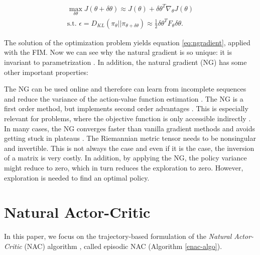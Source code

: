 \begin{align}
	\max_{\delta\theta} J(\theta + \delta\theta) \approx J(\theta) + \delta\theta^T\nabla_\theta J(\theta)\label{ng1}\\
	\text{s.t. } \epsilon = D_{KL}(\pi_{\theta} || \pi_{\theta + \delta\theta}) \approx \tfrac{1}{2} \delta\theta^T F_\theta \delta\theta\label{ng2}.
\end{align}

\noindent The solution of the optimization problem yields equation \ref{eq:ngradient}, applied with the FIM. Now we can see why the natural gradient is so unique: it is invariant to parametrization \citep{pascanu2013revisiting, peters2008natural}. In addition, the natural gradient (NG) has some other important properties:

\begin{itemize}
	\x {} The NG can be used online and therefore can learn from incomplete sequences and reduce the variance of the action-value function estimation \cite{pascanu2013revisiting, peters2008natural}.
	\x {} The NG is a first order method, but implements second order advantages \cite{pascanu2013revisiting}. This is especially relevant for problems, where the objective function is only accessible indirectly \cite{desjardins2013metric}.
	\x {} In many cases, the NG converges faster than vanilla gradient methods and avoids getting stuck in plateaus \cite{amari1998efficiently, sohl2012natural}.
	\x {} The Riemannian metric tensor needs to be nonsingular and invertible. This is not always the case and even if it is the case, the inversion of a matrix is very costly. In addition, by applying the NG, the policy variance might reduce to zero, which in turn reduces the exploration to zero. However, exploration is needed to find an optimal policy.
\end{itemize}

\section{Natural Actor-Critic}
\label{sec:nac}
In this paper, we focus on the trajectory-based formulation of the \textit{Natural Actor-Critic} (NAC) algorithm \citep{peters2005natural}, called episodic NAC (Algorithm \ref{enac-algo}).

